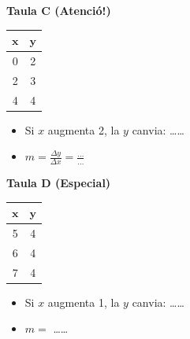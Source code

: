 \documentclass[12pt,a4paper]{article}
\begin{document}
\begin{minipage}{0.45\textwidth}
    \textbf{Taula C (Atenció!)}
    \begin{center}
    \begin{tabular}{|c|c|}
        \hline
        $\mathbf{x}$ & $\mathbf{y}$ \\ \hline
        0 & 2 \\ \hline
        2 & 3 \\ \hline
        4 & 4 \\ \hline
    \end{tabular}
    \end{center}
    \begin{itemize}
        \item Si $x$ augmenta 2, la $y$ canvia: \dots\dots
        \item $m = \frac{\Delta y}{\Delta x} = \frac{\dots}{\dots}$ 
    \end{itemize}
\end{minipage}
\hfill
\begin{minipage}{0.45\textwidth}
    \textbf{Taula D (Especial)}
    \begin{center}
    \begin{tabular}{|c|c|}
        \hline
        $\mathbf{x}$ & $\mathbf{y}$ \\ \hline
        5 & 4 \\ \hline
        6 & 4 \\ \hline
        7 & 4 \\ \hline
    \end{tabular}
    \end{center}
    \begin{itemize}
        \item Si $x$ augmenta 1, la $y$ canvia: \dots\dots
        \item $m = $ \dots\dots
    \end{itemize}
\end{minipage}
\end{document}
